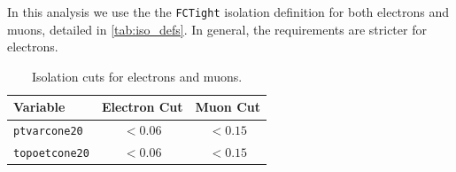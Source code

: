 In this analysis we use the the \texttt{FCTight} isolation definition for both electrons and muons, detailed in \autoref{tab:iso_defs}. In general, the requirements are stricter for electrons. 


\begin{table}
\centering
\begin{tabular}{lcc}
Variable & Electron Cut & Muon Cut  \\
\hline
\texttt{ptvarcone20}   & $< 0.06$   & $ < 0.15$ \\
\texttt{topoetcone20} &  $< 0.06$   & $ < 0.15$\\
\hline
\end{tabular}
\caption{Isolation cuts for electrons and muons.}
\label{tab:iso_defs}
\end{table}








